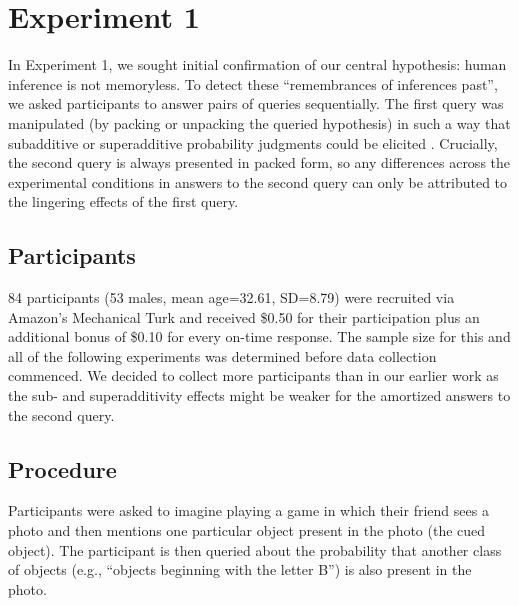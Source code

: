 \section{Experiment 1}

In Experiment 1, we sought initial confirmation of our central hypothesis: human inference is not memoryless. To detect these ``remembrances of inferences past'', we asked participants to answer pairs of queries sequentially. The first query was manipulated (by packing or unpacking the queried hypothesis) in such a way that subadditive or superadditive probability judgments could be elicited \citep{dasgupta17}. Crucially, the second query is always presented in packed form, so any differences across the experimental conditions in answers to the second query can only be attributed to the lingering effects of the first query.

\subsection{Participants}

84 participants (53 males, mean age=32.61, SD=8.79) were recruited via Amazon's Mechanical Turk and received \$0.50 for their participation plus an additional bonus of \$0.10 for every on-time response. 
The sample size for this and all of the following experiments was determined before data collection commenced. We decided to collect more participants than in our earlier work \citep{dasgupta17} as the sub- and superadditivity effects might be weaker for the amortized answers to the second query.

\subsection{Procedure}

Participants were asked to imagine playing a game in which their friend sees a photo and then mentions one particular object present in the photo (the cued object). The participant is then queried about the probability that another class of objects (e.g., ``objects beginning with the letter B'') is also present in the photo.

